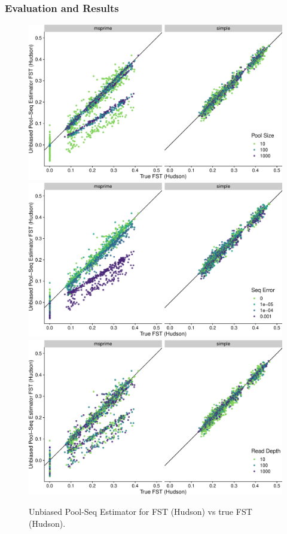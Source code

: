 \documentclass[a4paper,fontsize=9pt,DIV=14]{scrartcl}
\begin{document}

\subsubsection*{Evaluation and Results}
\label{supp:sec:FST:sub:Comparison:sub:Results}

\begin{figure}[p]
    \centering
    \includegraphics[width=.75\linewidth]{true_hudson_fst-est_spence_hudson-pool_size.pdf}
    \includegraphics[width=.75\linewidth]{true_hudson_fst-est_spence_hudson-seq_error.pdf}
    \includegraphics[width=.75\linewidth]{true_hudson_fst-est_spence_hudson-read_depth.pdf}
    \vspace*{-1em}
    \caption{
        Unbiased Pool-Seq Estimator for FST (Hudson) vs true FST (Hudson).
    }
\label{fig:UnbiasedHudson}
\end{figure}
\end{document}
